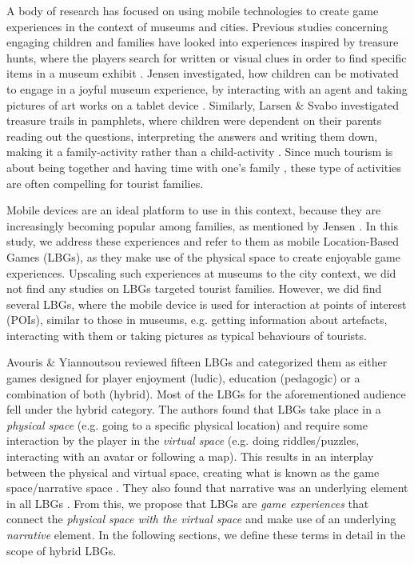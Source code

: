 A body of research has focused on using mobile technologies to create game experiences in the context of museums and cities. Previous studies concerning engaging children and families have looked into experiences inspired by treasure hunts, where the players search for written or visual clues in order to find specific items in a museum exhibit \cite{Lynge} \cite{larsen2014tourist}. Jensen investigated, how children can be motivated to engage in a joyful museum experience, by interacting with an agent and taking pictures of art works on a tablet device \cite{Lynge}. Similarly, Larsen \& Svabo investigated treasure trails in pamphlets, where children were dependent on their parents reading out the questions, interpreting the answers and writing them down, making it a family-activity rather than a child-activity \cite{larsen2014tourist}. Since much tourism is about being together and having time with one’s family \cite{larsen2014tourist}, these type of activities are often compelling for tourist families. 

Mobile devices are an ideal platform to use in this context, because they are increasingly becoming popular among families, as mentioned by Jensen \cite{Lynge}. In this study, we address these experiences and refer to them as mobile Location-Based Games (LBGs), as they make use of the physical space to create enjoyable game experiences. Upscaling such experiences at museums to the city context, we did not find any studies on LBGs targeted tourist families. However, we did find several LBGs, where the mobile device is used for interaction at points of interest (POIs), similar to those in museums, e.g. getting information about artefacts, interacting with them or taking pictures as typical behaviours of tourists. 

Avouris \& Yiannoutsou reviewed fifteen LBGs and categorized them as either games designed for player enjoyment (ludic), education (pedagogic) or a combination of both (hybrid). Most of the LBGs for the aforementioned audience fell under the hybrid category. The authors found that LBGs take place in a \textit{physical space} (e.g. going to a specific physical location) and require some interaction by the player in the \textit{virtual space} (e.g. doing riddles/puzzles, interacting with an avatar or following a map). This results in an interplay between the physical and virtual space, creating what is known as the game space/narrative space \cite{LBG_Review}. They also found that narrative was an underlying element in all LBGs \cite{LBG_Review}. From this, we propose that LBGs are \textit{game experiences} that connect the \textit{physical space with the virtual space} and make use of an underlying \textit{narrative} element. In the following sections, we define these terms in detail in the scope of hybrid LBGs. 
